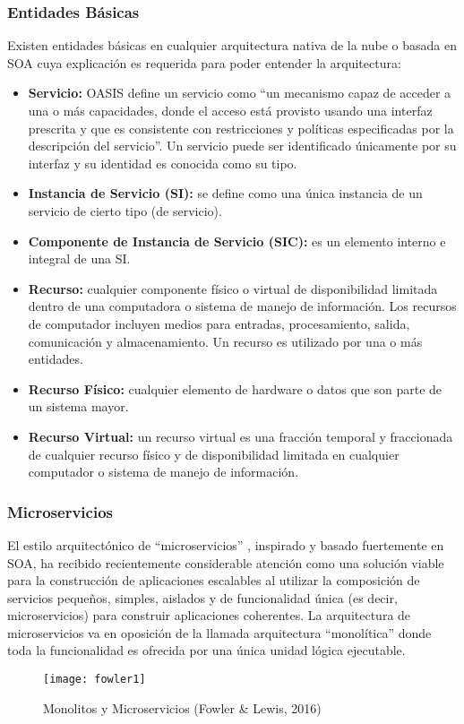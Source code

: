         \subsubsection{Entidades Básicas}
        Existen entidades básicas en cualquier arquitectura nativa de la nube o basada en SOA cuya explicación es requerida para poder entender la arquitectura:
        \begin{itemize}
            \item \textbf{Servicio:} OASIS define un servicio como  “un mecanismo capaz de acceder a una o más capacidades, donde el acceso está provisto usando una interfaz prescrita y que es consistente con restricciones y políticas especificadas por la descripción del servicio”. Un servicio puede ser identificado únicamente por su interfaz y su identidad es conocida como su tipo. 
            \item \textbf{Instancia de Servicio (SI):} se define como una única instancia de un servicio de cierto tipo (de servicio).
            \item \textbf{Componente de Instancia de Servicio (SIC):} es un elemento interno e integral de una SI.
            \item \textbf{Recurso:} cualquier componente físico o virtual de disponibilidad limitada dentro de una computadora o sistema de manejo de información. Los recursos de computador incluyen medios para entradas, procesamiento, salida, comunicación y almacenamiento. Un recurso es utilizado por una o más entidades.
            \item \textbf{Recurso Físico:} cualquier elemento de hardware o datos que son parte de un sistema mayor.
            \item \textbf{Recurso Virtual: }un recurso virtual es una fracción temporal y fraccionada de cualquier recurso físico y de disponibilidad limitada en cualquier computador o sistema de manejo de información.
        \end{itemize}
     
        \subsubsection{Microservicios}
        El estilo arquitectónico de “microservicios” \parencite{Lewis2016-az}, inspirado y basado fuertemente en SOA, ha recibido recientemente considerable atención como una solución viable para la construcción de aplicaciones escalables  al utilizar la composición de servicios pequeños, simples, aislados y de funcionalidad única (es decir, microservicios) para construir aplicaciones coherentes. La arquitectura de microservicios va en oposición de la llamada arquitectura “monolítica” donde toda la funcionalidad es ofrecida por una única unidad lógica ejecutable.
        \begin{figure}[ht]
            \centering
            \texttt{[image: fowler1]}
            \caption{Monolitos y Microservicios (Fowler \& Lewis, 2016)}
            \label{fig:fowler1}
        \end{figure}
    
